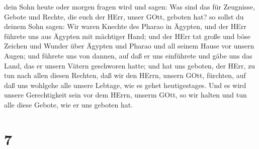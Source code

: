 dein Sohn heute oder morgen fragen wird und sagen: Was sind das für
Zeugnisse, Gebote und Rechte, die euch der HErr, unser GOtt, geboten
hat?  so sollst du deinem Sohn sagen: Wir waren Knechte des
Pharao in Ägypten, und der HErr führete uns aus Ägypten mit mächtiger
Hand;  und der HErr tat große und böse Zeichen und Wunder
über Ägypten und Pharao und all seinem Hause vor unsern Augen;
 und führete uns von dannen, auf daß er uns einführete und
gäbe uns das Land, das er unsern Vätern geschworen hatte; 
und hat uns geboten, der HErr, zu tun nach allen diesen Rechten, daß wir
den HErrn, unsern GOtt, fürchten, auf daß uns wohlgehe alle unsere
Lebtage, wie es gehet heutigestages.  Und es wird unsere
Gerechtigkeit sein vor dem HErrn, unserm GOtt, so wir halten und tun
alle diese Gebote, wie er uns geboten hat.

\hypertarget{section-6}{%
\section{7}\label{section-6}}

